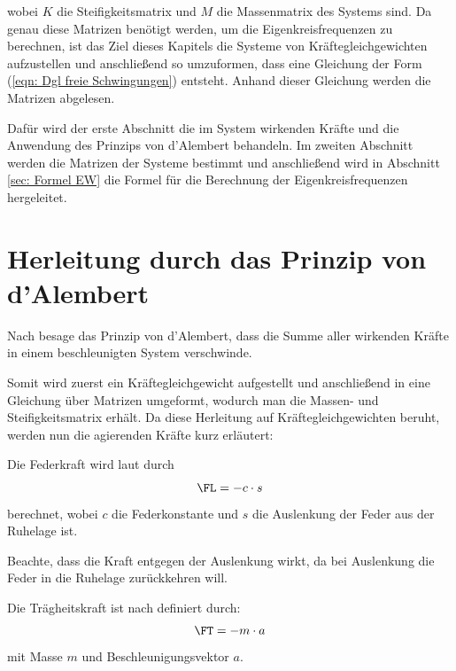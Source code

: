 \documentclass[a4paper,12pt]{report}
\newcommand{\1}{\mathds{1}}
\theoremstyle{plain} %
\theoremstyle{definition} %
\theoremstyle{remark}
\begin{document}
      wobei $K$ die Steifigkeitsmatrix und $M$ die Massenmatrix des Systems sind.
      Da genau diese Matrizen benötigt werden, um die Eigenkreisfrequenzen zu berechnen, ist das Ziel dieses Kapitels die Systeme von Kräftegleichgewichten aufzustellen und anschließend so umzuformen, dass eine Gleichung der Form (\ref{eqn: Dgl freie Schwingungen}) entsteht.
      Anhand dieser Gleichung werden die Matrizen abgelesen.

      Dafür wird der erste Abschnitt die im System wirkenden Kräfte und die Anwendung des Prinzips von d'Alembert behandeln.
      Im zweiten Abschnitt werden die Matrizen der Systeme bestimmt und anschließend wird in Abschnitt \ref{sec: Formel EW} die Formel für die Berechnung der Eigenkreisfrequenzen hergeleitet. 
      
      \section{Herleitung durch das Prinzip von d'Alembert}
            Nach \cite{d_AlembertPrinzip} besage das Prinzip von d'Alembert, dass die Summe aller wirkenden Kräfte in einem beschleunigten System verschwinde.

            Somit wird zuerst ein Kräftegleichgewicht aufgestellt und anschließend in eine Gleichung über Matrizen umgeformt, wodurch man die Massen- und Steifigkeitsmatrix erhält.
            Da diese Herleitung auf Kräftegleichgewichten beruht, werden nun die agierenden Kräfte kurz erläutert:

            Die Federkraft \FL wird laut \cite{federkraft} durch
            \begin{equation}
                  \label{eqn: Federkraft}
                  \FL = -c\cdot s
            \end{equation}
            berechnet, wobei $c$ die Federkonstante und $s$ die Auslenkung der Feder aus der Ruhelage ist.

            Beachte, dass die Kraft entgegen der Auslenkung wirkt, da bei Auslenkung die Feder in die Ruhelage zurückkehren will.
                  
            Die Trägheitskraft \FT ist nach \cite{trägheitskraft} definiert durch:
            \begin{equation}
                  \label{eqn: Trägheitskraft}
                  \FT = -m\cdot a
            \end{equation}
            mit Masse $m$ und Beschleunigungsvektor $a$.    
            
\end{document}
